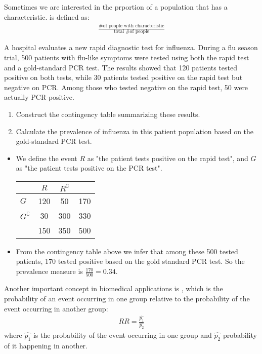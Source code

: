 Sometimes we are interested in the prportion of a population that has a characteristic.
 is defined as:
\begin{gather*}
	\frac{\text{\# of people with characteristic}}{\text{total \# of people}}
\end{gather*}

\begin{exmp}
	A hospital evaluates a new rapid diagnostic test for influenza.
	During a flu season trial, 500 patients with flu-like symptoms were tested using both the rapid test and a gold-standard PCR test.
	The results showed that 120 patients tested positive on both tests,
	while 30 patients tested positive on the rapid test but negative on PCR.
	Among those who tested negative on the rapid test,
	50 were actually PCR-positive.
	\begin{enumerate}
		\item Construct the contingency table summarizing these results.
		\item Calculate the prevalence of influenza in this patient population based on the gold-standard PCR test.
	\end{enumerate}
\end{exmp}
\begin{solution}
	\begin{itemize}
	\item We define the event \( R \) as "the patient tests positive on the rapid test", and \( G \) as "the patient tests positive on the PCR test".
	\begin{center}
	\begin{tabular}{l|cc|c}
						& \( R \) & \( R^\complement \) &  \\ \hline
	\( G \)                & 120 & 50 & 170\\ 
	\( G^\complement \)    & 30 & 300 & 330 \\ \hline
						& 150 & 350 & 500
	\end{tabular}
	\end{center}
	\item From the contingency table above we infer that among these 500 tested patients, 170 tested positive based on the gold standard PCR test.
	So the prevalence measure is \( \frac{170}{500} = 0.34 \).
	\end{itemize}
\end{solution}

Another important concept in biomedical applications is ,
which is the probability of an event occurring in one group relative to the probability of the event occurring in another group:
\begin{gather*}
	RR = \frac{\hat{p_1}}{\hat{p_2}}
\end{gather*}
where \( \hat{p_1} \) is the probability of the event occurring in one group and \( \hat{p_2} \) probability of it happening in another.

